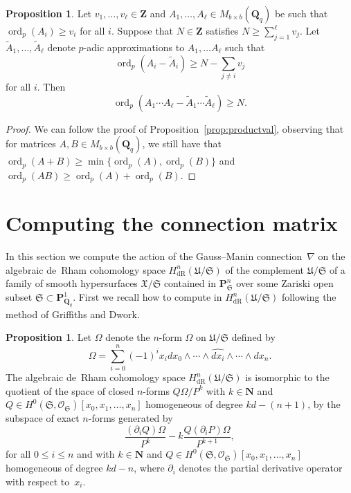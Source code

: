 \documentclass[a4paper,11pt]{article}
\numberwithin{equation}{section}
\newcommand{\NN}{\mathbf{N}} %
\newcommand{\ZZ}{\mathbf{Z}} %
\newcommand{\QQ}{\mathbf{Q}} %
\DeclareMathOperator{\ord}{ord}          %
\providecommand{\HdR}{H_{\text{dR}}}    %
\theoremstyle{definition}
\newtheorem{prop}[thm]{Proposition}
\begin{document}
\begin{prop} \label{prop:matrixproductval}
Let $v_1,\ldots,v_{\ell} \in \ZZ$ and $A_1, \dotsc, A_{\ell} \in M_{b \times b}(\QQ_q)$
be such that $\ord_p(A_i) \geq v_i$ for all $i$. Suppose that $N \in \ZZ$ satisfies 
$N \geq \sum_{j=1}^{\ell} v_j$.
Let $\tilde{A}_1, \dotsc, \tilde{A}_{\ell}$ denote $p$-adic approximations 
to $A_1, \dotsc A_{\ell}$ such that
\[
\ord_p(A_i - \tilde{A}_i) \geq N - \sum_{j \neq i} v_j
\]
for all $i$.  Then 
\begin{equation}
\ord_p(A_1 \dotsm A_{\ell} - \tilde{A}_1 \dotsm \tilde{A}_{\ell}) \geq N.
\end{equation}
\end{prop}

\begin{proof}
We can follow the proof of Proposition~\ref{prop:productval}, 
observing that for matrices $A,B \in M_{b \times b}(\QQ_q)$, we still have that
$\ord_p(A + B) \geq \min \{\ord_p(A), \ord_p(B)\}$ and $\ord_p(AB) \geq \ord_p(A)+\ord_p(B)$.
\end{proof}

\section{Computing the connection matrix}
\label{sec:Connection}

In this section we compute the action of the Gauss--Manin connection~$\nabla$ on 
the algebraic de~Rham cohomology space $\HdR^{n}(\mathfrak{U}/\mathfrak{S})$ of the 
complement $\mathfrak{U}/\mathfrak{S}$ of a family of smooth hypersurfaces 
$\mathfrak{X}/\mathfrak{S}$ contained in $\mathbf{P}^n_{\mathfrak{S}}$ over
some Zariski open subset $\mathfrak{S} \subset \mathbf{P}^1_{\QQ_q}$.
First we recall how to compute in $\HdR^{n}(\mathfrak{U}/\mathfrak{S})$ 
following the method of Griffiths and Dwork.  

\begin{prop}
Let $\Omega$ denote the $n$-form $\Omega$ on $\mathfrak{U}/\mathfrak{S}$ 
defined by 
\begin{equation}
\Omega = \sum_{i=0}^n (-1)^i x_i d x_0 \wedge \dotsb \wedge \widehat{d x_i} \wedge \dotsb \wedge d x_n.
\end{equation}
The algebraic de~Rham cohomology space $\HdR^{n}(\mathfrak{U}/\mathfrak{S})$ is 
isomorphic to the quotient of the space of closed $n$-forms 
$Q \Omega / P^k$ with $k \in \NN$ and $Q \in H^0(\mathfrak{S},\mathcal{O}_{\mathfrak{S}})[x_0, x_1, \dotsc, x_n]$ 
homogeneous of degree $k d - (n + 1)$, by the subspace of exact $n$-forms generated by
\begin{equation} \label{eq:deRhamRel}
\frac{(\partial_i Q) \Omega}{P^k} - k \frac{Q (\partial_i P) \Omega}{P^{k+1}},
\end{equation}
for all $0 \leq i \leq n$ and with $k \in \NN$ and $Q \in H^0(\mathfrak{S},\mathcal{O}_{\mathfrak{S}})[x_0, x_1, \dotsc, x_n]$ 
homogeneous of degree $kd-n$, where $\partial_i$ denotes the partial derivative operator with respect to~$x_i$.
\end{prop}
\end{document}
